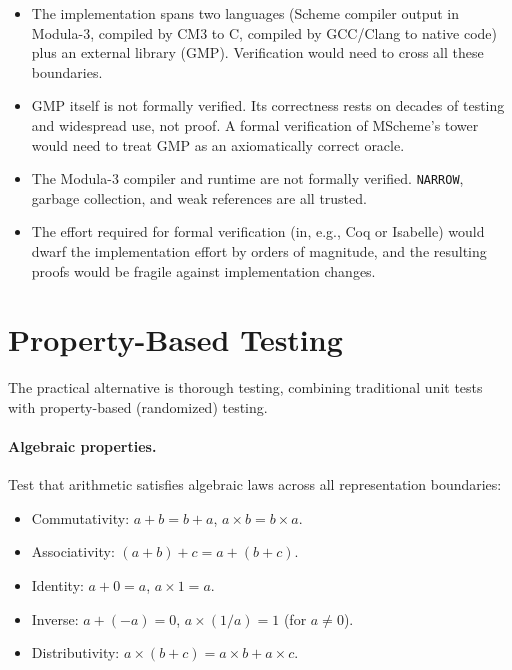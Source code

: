 \documentclass[12pt]{report}
\begin{document}
\begin{itemize}
\item The implementation spans two languages (Scheme compiler output
  in Modula-3, compiled by CM3 to C, compiled by GCC/Clang to native
  code) plus an external library (GMP).  Verification would need to
  cross all these boundaries.

\item GMP itself is not formally verified.  Its correctness rests
  on decades of testing and widespread use, not proof.  A formal
  verification of MScheme's tower would need to treat GMP as an
  axiomatically correct oracle.

\item The Modula-3 compiler and runtime are not formally verified.
  {\tt NARROW}, garbage collection, and weak references are all
  trusted.

\item The effort required for formal verification (in, e.g.,
  Coq or Isabelle) would dwarf the implementation effort by orders
  of magnitude, and the resulting proofs would be fragile against
  implementation changes.
\end{itemize}

\section{Property-Based Testing}

The practical alternative is thorough testing, combining traditional
unit tests with property-based (randomized) testing.

\paragraph{Algebraic properties.}
Test that arithmetic satisfies algebraic laws across all
representation boundaries:

\begin{itemize}
\item Commutativity: $a + b = b + a$, $a \times b = b \times a$.
\item Associativity: $(a + b) + c = a + (b + c)$.
\item Identity: $a + 0 = a$, $a \times 1 = a$.
\item Inverse: $a + (-a) = 0$, $a \times (1/a) = 1$ (for $a \neq 0$).
\item Distributivity: $a \times (b + c) = a \times b + a \times c$.
\end{itemize}
\end{document}
